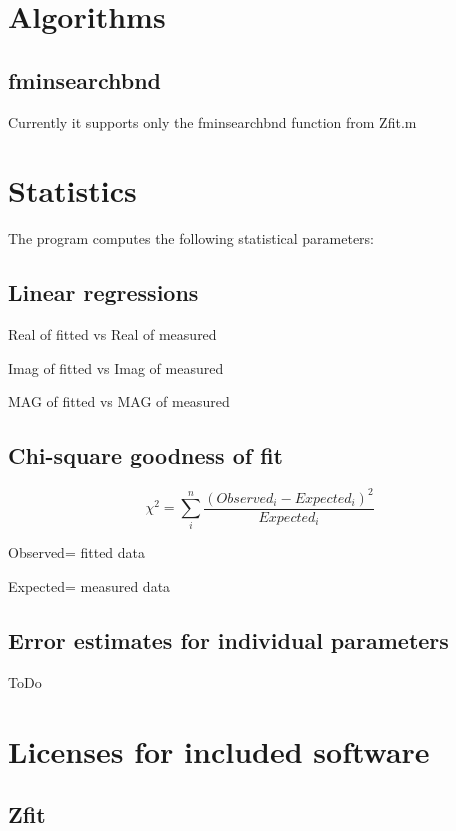 \documentclass[10pt,a4paper,oneside]{book}
\begin{document}
\chapter{Algorithms}

\section{fminsearchbnd}

Currently it supports only the fminsearchbnd function from Zfit.m




\chapter{Statistics}

The program computes the following statistical parameters:

\section{Linear regressions}

Real of fitted vs Real of measured

Imag of fitted vs Imag of measured

MAG of fitted vs MAG of measured

\section{Chi-square goodness of fit}

\[ \chi^2 = \sum_i^n{\dfrac{(Observed_i-Expected_i)^2}{Expected_i}} \]

Observed= fitted data

Expected= measured data

\section{Error estimates for individual parameters}

ToDo



\newpage{}
\chapter{Licenses for included software}

\section{Zfit}
\end{document}
